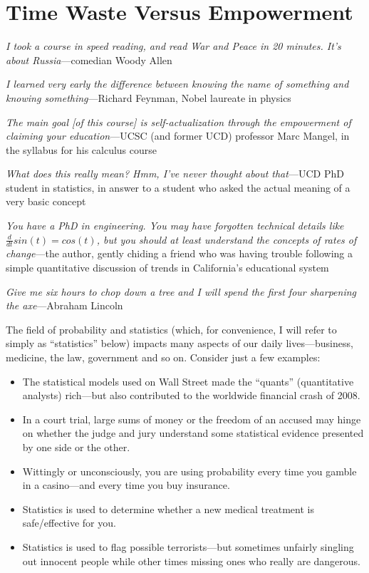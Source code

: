 \chapter{Time Waste Versus Empowerment}
\label{rant}

{\it I took a course in speed reading, and read War and Peace in 20
minutes.  It's about Russia}---comedian Woody Allen

{\it I learned very early the difference between knowing the name of
something and knowing something}---Richard Feynman, Nobel laureate in
physics

{\it The main goal [of this course] is self-actualization through the
empowerment of claiming your education}---UCSC (and former UCD)
professor Marc Mangel, in the syllabus for his calculus course

{\it What does this really mean?  Hmm, I've never thought about
that}---UCD PhD student in statistics, in answer to a student who asked
the actual meaning of a very basic concept

{\it You have a PhD in engineering.  You may have forgotten
technical details like $\frac{d}{dt} sin(t) = cos(t)$, but you should at
least understand the concepts of rates of change}---the author, gently
chiding a friend who was having trouble following a simple quantitative
discussion of trends in California's educational system

{\it Give me six hours to chop down a tree and I will spend the first
four sharpening the axe}---Abraham Lincoln

\bigskip

The field of probability and statistics (which, for convenience, I will
refer to simply as ``statistics'' below) impacts many aspects of our
daily lives---business, medicine, the law, government and so on.
Consider just a few examples:

\begin{itemize}

\item The statistical  models used on Wall Street made the ``quants''
(quantitative analysts) rich---but also contributed to the worldwide
financial crash of 2008.

\item In a court trial, large sums of money or the freedom of an accused
may hinge on whether the judge and jury understand some statistical
evidence presented by one side or the other.

\item Wittingly or unconsciously, you are using probability every time
you gamble in a casino---and every time you buy insurance.

\item Statistics is used to determine whether a new medical treatment is
safe/effective for you.

\item Statistics is used to flag possible terrorists---but sometimes
unfairly singling out innocent people while other times missing ones who
really are dangerous.

\end{itemize}

